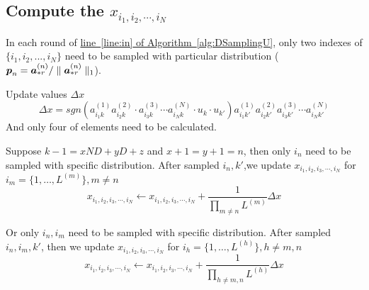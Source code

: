 \documentclass{article}
\newcommand{\Sca}[3]{{#1}^{(#2)}_{i_#2#3}}%
\newcommand{\V}[1]{{\bm{{\MakeLowercase{#1}}}}}%
\newcommand{\Vacol}[1]{\V{a}^{(#1)}_{*r}}
\newcommand{\norm}[2]{\parallel#1\parallel_{#2}}
\newcommand{\AlgLine}[2]{\hyperref[alg:#1]{line~\ref*{line:#2} of Algorithm~\ref*{alg:#1}}}
\begin{document}
\subsection{Compute the $x_{i_1,i_2,\cdots,i_N}$}
\begin{asparaitem}
\item
In each round of \AlgLine{DSamplingU}{in}, only two indexes of $\{i_1,i_2,...,i_N\}$ need to be sampled with particular distribution ($\V{p}_n = \Vacol{n}/\norm{\Vacol{n}}{1}$).
\item Update values $\Delta x$\\
\[\Delta x = sgn(\Sca{a}{1}{k}\Sca{a}{2}{k}\cdot\Sca{a}{3}{k}\cdots\Sca{a}{N}{k}\cdot u_k\cdot u_{k'})
\Sca{a}{1}{k'}\Sca{a}{2}{k'}\Sca{a}{3}{k'}\cdots\Sca{a}{N}{k'}\]
And only four of elements need to be calculated.
\item
Suppose $k-1 = xND + yD + z$ and $x+1 = y+1 = n$, then only $i_n$ need to be sampled with specific distribution.
After sampled $i_n,k'$,we update $x_{i_1,i_2,i_3,\cdots,i_N}$ for $i_m = \{1,\ldots,L^{(m)}\},m\neq n$
\[x_{i_1,i_2,i_3,\cdots,i_N}\leftarrow x_{i_1,i_2,i_3,\cdots,i_N} + \frac{1}{\prod_{m\neq n}L^{(m)}}\Delta x\]
\item
Or only $i_n,i_m$ need to be sampled with specific distribution.
After sampled $i_n,i_m,k'$, then we update $x_{i_1,i_2,i_3,\cdots,i_N}$ for $i_h = \{1,\ldots,L^{(h)}\},h\neq m,n$
\[x_{i_1,i_2,i_3,\cdots,i_N}\leftarrow x_{i_1,i_2,i_3,\cdots,i_N} + \frac{1}{\prod_{h\neq m,n}L^{(h)}}\Delta x\]

\end{asparaitem}
\end{document}
